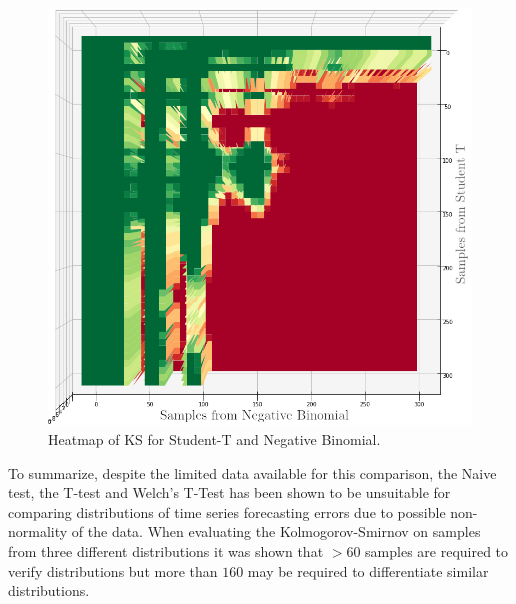 \begin{figure}[h]
  \centering
  \includegraphics[width=\linewidth]{./img/hypothesis_test/deepar_heatmap_Y_student_t_X_neg_bin_ks_edited.png}
  \caption{Heatmap of KS for Student-T and Negative Binomial.}
  \label{ks_student_t_neg_bin}
  \endminipage
\end{figure}

To summarize, despite the limited data available for this comparison, the Naive test, the T-test and Welch’s T-Test has been shown to be unsuitable for comparing distributions of time series forecasting errors due to possible non-normality of the data. When evaluating the Kolmogorov-Smirnov on samples from three different distributions it was shown that \(>60\) samples are required to verify distributions but more than \(160\) may be required to differentiate similar distributions.



